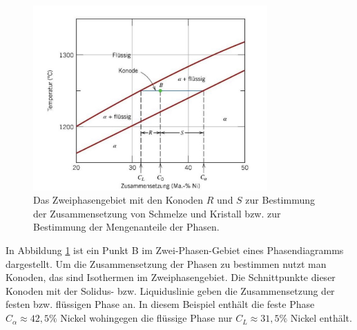 \documentclass[11pt,a4paper]{article}
\numberwithin{equation}{section}
\numberwithin{figure}{section}
\begin{document}
\\
\begin{addmargin}[25pt]{0pt}
\begin{figure}[h]
    \centering
    \includegraphics[width = 0.8\textwidth]{images/Materialwissenschaften/Zweiphasengebiet_Konode.jpeg}
    \caption{Das Zweiphasengebiet mit den Konoden $R$ und $S$ zur Bestimmung der Zusammensetzung von Schmelze und Kristall bzw. zur Bestimmung der Mengenanteile der Phasen.}
    \label{fig:zweiphasengebiet_konode}
\end{figure}
In Abbildung \ref{fig:zweiphasengebiet_konode} ist ein Punkt B im Zwei-Phasen-Gebiet eines Phasendiagramms dargestellt. Um die Zusammensetzung der Phasen zu bestimmen nutzt man Konoden, das sind Isothermen im Zweiphasengebiet. Die Schnittpunkte dieser Konoden mit der Solidus- bzw. Liquiduslinie geben die Zusammensetzung der festen bzw. flüssigen Phase an. In diesem Beispiel enthält die feste Phase $C_\alpha \approx 42,5\%$  Nickel wohingegen die flüssige Phase nur $C_L \approx 31,5\%$ Nickel enthält.\\
\end{addmargin}
\end{document}
